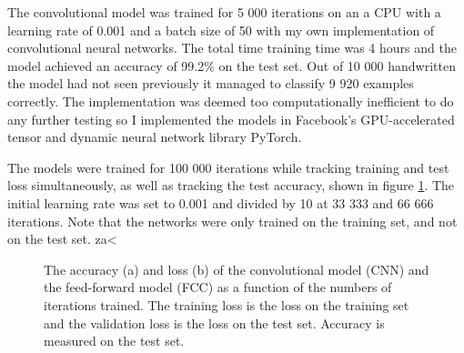 \documentclass[a4paper, twoside]{article}
\begin{document}
The convolutional model was trained for 5 000 iterations on an a CPU with a learning rate of 0.001 and a batch size of 50 with my own implementation of convolutional neural networks. The total time training time was 4 hours and the model achieved an accuracy of 99.2\% on the test set. Out of 10 000 handwritten the model had not seen previously it managed to classify 9 920 examples correctly. The implementation was deemed too computationally inefficient to do any further testing so I implemented the models in Facebook's GPU-accelerated tensor and dynamic neural network library PyTorch.

The models were trained for 100 000 iterations while tracking training and test loss simultaneously, as well as tracking the test accuracy, shown in figure \ref{figaccloss}. The initial learning rate was set to 0.001 and divided by 10 at 33 333 and 66 666 iterations. Note that the networks were only trained on the training set, and not on the test set.
za<
\begin{figure}[h]
    \centering
    \caption{The accuracy (a) and loss (b) of the convolutional model (CNN) and the feed-forward model (FCC) as a function of the numbers of iterations trained. The training loss is the loss on the training set and the validation loss is the loss on the test set. Accuracy is measured on the test set.} \label{figaccloss}
\end{figure}
\end{document}
